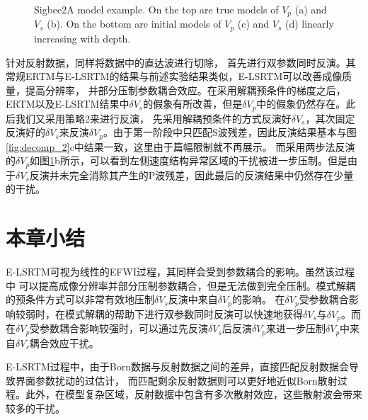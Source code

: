 \begin{figure}[!htb]
   \centering
   \caption{Sigbee2A model example. On the top are true models of 
   $V_p$ (a) and $V_s$ (b). On the bottom are initial models of $V_p$ (c) and $V_s$
   (d) linearly increasing with depth. }
   \label{fig:final_comparison_2}
\end{figure}
针对反射数据，同样将数据中的直达波进行切除，
首先进行双参数同时反演。其常规ERTM与E-LSRTM的结果与前述实验结果类似，E-LSRTM可以改善成像质量，提高分辨率，
并部分压制参数耦合效应。在采用解耦预条件的梯度之后，ERTM以及E-LSRTM结果中$\delta
V_s$的假象有所改善，但是$\delta
V_p$中的假象仍然存在。此后我们又采用策略2来进行反演，
先采用解耦预条件的方式反演好$\delta V_s$，其次固定反演好的$\delta V_s$来反演$\delta
V_p$。由于第一阶段中只匹配S波残差，因此反演结果基本与图\ref{fig:decomp_2}c中结果一致，这里由于篇幅限制就不再展示。
而采用两步法反演的$\delta
V_p$如图\ref{fig:final_comparison_2}b所示，可以看到左侧速度结构异常区域的干扰被进一步压制。但是由于$\delta V_s$反演并未完全消除其产生的P波残差，因此最后的反演结果中仍然存在少量的干扰。
\section{本章小结}
E-LSRTM可视为线性的EFWI过程，其同样会受到参数耦合的影响。虽然该过程中
可以提高成像分辨率并部分压制参数耦合，但是无法做到完全压制。模式解耦的预条件方式可以非常有效地压制$\delta
V_s$反演中来自$\delta V_p$的影响。
在$\delta V_p$受参数耦合影响较弱时，在模式解耦的帮助下进行双参数同时反演可以快速地获得$\delta
V_s$与$\delta V_p$。而在$\delta V_p$受参数耦合影响较强时，可以通过先反演$\delta V_s$后反演$\delta
V_p$来进一步压制$\delta V_p$中来自$\delta V_s$耦合效应干扰。

E-LSRTM过程中，由于Born数据与反射数据之间的差异，直接匹配反射数据会导致界面参数扰动的过估计，
而匹配剩余反射数据则可以更好地近似Born散射过程。此外，在模型复杂区域，反射数据中包含有多次散射效应，这些散射波会带来较多的干扰。
